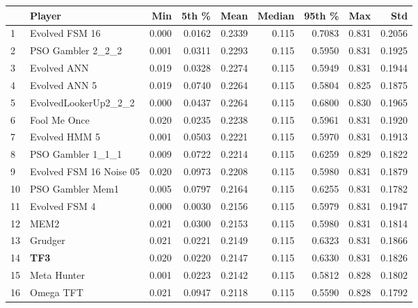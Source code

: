 \begin{tabular}{llrrrrrrr}
\toprule
{} &                   Player &    Min &   5th \% &    Mean &  Median &  95th \% &    Max &     Std \\
\midrule
1  &           Evolved FSM 16 &  0.000 &  0.0162 &  0.2339 &   0.115 &  0.7083 &  0.831 &  0.2056 \\
2  &        PSO Gambler 2\_2\_2 &  0.001 &  0.0311 &  0.2293 &   0.115 &  0.5950 &  0.831 &  0.1925 \\
3  &              Evolved ANN &  0.019 &  0.0328 &  0.2274 &   0.115 &  0.5949 &  0.831 &  0.1944 \\
4  &            Evolved ANN 5 &  0.019 &  0.0740 &  0.2264 &   0.115 &  0.5804 &  0.825 &  0.1875 \\
5  &     EvolvedLookerUp2\_2\_2 &  0.000 &  0.0437 &  0.2264 &   0.115 &  0.6800 &  0.830 &  0.1965 \\
6  &             Fool Me Once &  0.020 &  0.0235 &  0.2238 &   0.115 &  0.5961 &  0.831 &  0.1920 \\
7  &            Evolved HMM 5 &  0.001 &  0.0503 &  0.2221 &   0.115 &  0.5970 &  0.831 &  0.1913 \\
8  &        PSO Gambler 1\_1\_1 &  0.009 &  0.0722 &  0.2214 &   0.115 &  0.6259 &  0.829 &  0.1822 \\
9  &  Evolved FSM 16 Noise 05 &  0.020 &  0.0973 &  0.2208 &   0.115 &  0.5980 &  0.831 &  0.1879 \\
10 &         PSO Gambler Mem1 &  0.005 &  0.0797 &  0.2164 &   0.115 &  0.6255 &  0.831 &  0.1782 \\
11 &            Evolved FSM 4 &  0.000 &  0.0030 &  0.2156 &   0.115 &  0.5979 &  0.831 &  0.1947 \\
12 &                     MEM2 &  0.021 &  0.0300 &  0.2153 &   0.115 &  0.5980 &  0.831 &  0.1814 \\
13 &                  Grudger &  0.021 &  0.0221 &  0.2149 &   0.115 &  0.6323 &  0.831 &  0.1866 \\
14 &                      \textbf{TF3} &  0.020 &  0.0220 &  0.2147 &   0.115 &  0.6330 &  0.831 &  0.1826 \\
15 &              Meta Hunter &  0.001 &  0.0223 &  0.2142 &   0.115 &  0.5812 &  0.828 &  0.1802 \\
16 &                Omega TFT &  0.021 &  0.0947 &  0.2118 &   0.115 &  0.5590 &  0.828 &  0.1792 \\
\bottomrule
\end{tabular}
